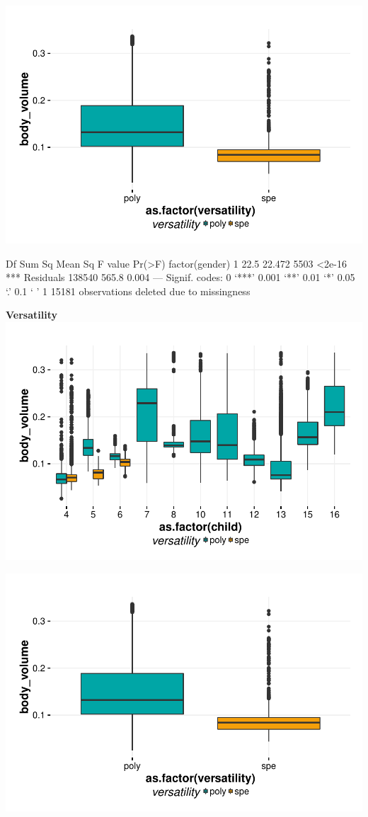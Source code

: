 \documentclass{article}
\begin{document}
\includegraphics{features-plot_body_volume_gender_quiz}

\begin{Schunk}
\begin{Soutput}
                   Df Sum Sq Mean Sq F value Pr(>F)    
factor(gender)      1   22.5  22.472    5503 <2e-16 ***
Residuals      138540  565.8   0.004                   
---
Signif. codes:  0 ‘***’ 0.001 ‘**’ 0.01 ‘*’ 0.05 ‘.’ 0.1 ‘ ’ 1
15181 observations deleted due to missingness
\end{Soutput}
\end{Schunk}


\textbf{Versatility}
\includegraphics{features-plot_body_volume_child_versatility_quiz}

\includegraphics{features-plot_body_volume_gender_quiz}
\end{document}
